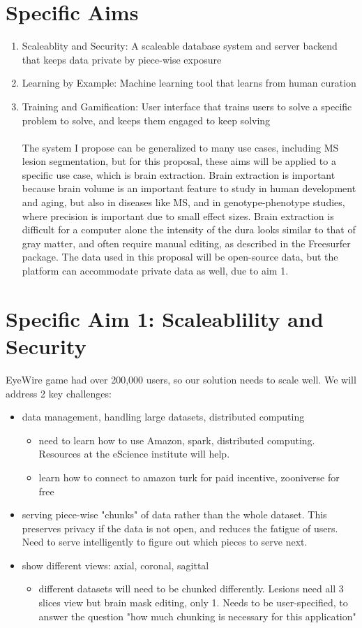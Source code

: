 \section{Specific Aims}
\begin{enumerate}
\item Scaleablity and Security: A scaleable database system and server backend that keeps data private by piece-wise exposure
\item Learning by Example: Machine learning tool that learns from human curation
\item Training and Gamification: User interface that trains users to solve a specific problem to solve, and keeps them engaged to keep solving
\\
\\
The system I propose can be generalized to many use cases, including MS lesion segmentation, but for this proposal, these aims will be applied to a specific use case, which is brain extraction. Brain extraction is important because brain volume is an important feature to study in human development and aging, but also in diseases like MS, and in genotype-phenotype studies, where precision is important due to small effect sizes. Brain extraction is difficult for a computer alone the intensity of the dura looks similar to that of gray matter, and often require manual editing, as described in the Freesurfer package. The data used in this proposal will be open-source data, but the platform can accommodate private data as well, due to aim 1. 

\end{enumerate}

\section{Specific Aim 1: Scaleablility and Security}
EyeWire game had over 200,000 users, so our solution needs to scale well. 
We will address 2 key challenges:
\begin{itemize}
\item data management, handling large datasets, distributed computing 
\begin{itemize}
\item need to learn how to use Amazon, spark, distributed computing. Resources at the eScience institute will help. 
\item learn how to connect to amazon turk for paid incentive, zooniverse for free
\end{itemize}
\item serving piece-wise "chunks" of data rather than the whole dataset. This preserves privacy if the data is not open, and reduces the fatigue of users. Need to serve intelligently to figure out which pieces to serve next.
\item show different views: axial, coronal, sagittal
\begin{itemize}
\item different datasets will need to be chunked differently. Lesions need all 3 slices view but brain mask editing, only 1. Needs to be user-specified, to answer the question "how much chunking is necessary for this application"
\end{itemize}
\end{itemize}

